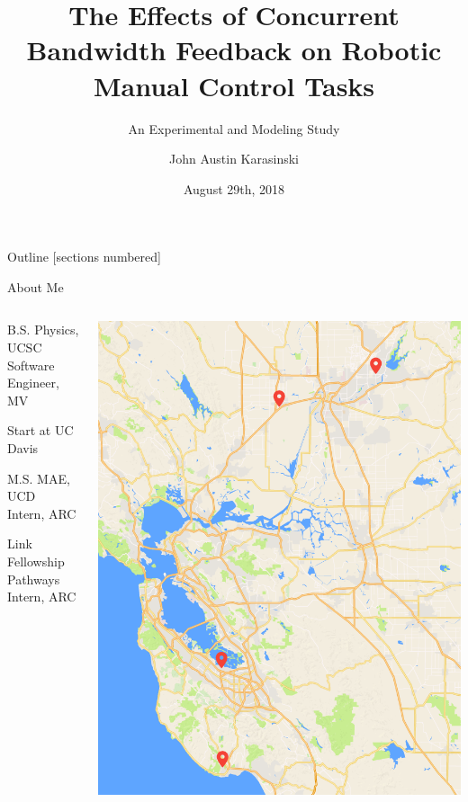 \documentclass[10pt]{beamer}
\title{The Effects of Concurrent Bandwidth Feedback on Robotic Manual Control Tasks}
\subtitle{An Experimental and Modeling Study}
\date{August 29th, 2018}
\author{John Austin Karasinski}
\institute{Qualifying Examination}
\begin{document}
\maketitle

\begin{frame}{Outline}
  [sections numbered]
  \tableofcontents[]
\end{frame}

\begin{frame}[fragile]{About Me}
  \begin{columns}[T]
    \begin{column}{.5\textwidth}
      \begin{description}[align=right]
        \setlength\itemsep{1em}
        \item [2012] B.S. Physics, UCSC\\
              Software Engineer, MV
        \item [2013] Start at UC Davis
        \item [2016] M.S. MAE, UCD\\
              Intern, ARC
        \item [2017] Link Fellowship\\
              Pathways Intern, ARC
      \end{description}
    \end{column}
    \begin{column}{.5\textwidth}
      \includegraphics[width=\textwidth]{../img/california.png}
    \end{column}
  \end{columns}
\end{frame}
\end{document}
